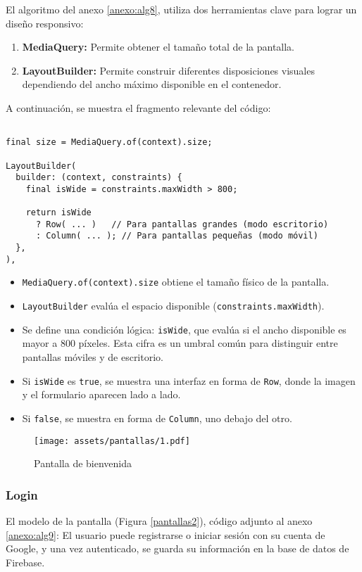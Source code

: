 El algoritmo del anexo \ref{anexo:alg8}, utiliza dos herramientas clave para lograr un diseño responsivo:

\begin{enumerate}
    \item \textbf{MediaQuery:} Permite obtener el tamaño total de la pantalla.
    \item \textbf{LayoutBuilder:} Permite construir diferentes disposiciones visuales dependiendo del ancho máximo disponible en el contenedor.
\end{enumerate}

A continuación, se muestra el fragmento relevante del código:

\begin{verbatim}

final size = MediaQuery.of(context).size;

LayoutBuilder(
  builder: (context, constraints) {
    final isWide = constraints.maxWidth > 800;

    return isWide
      ? Row( ... )   // Para pantallas grandes (modo escritorio)
      : Column( ... ); // Para pantallas pequeñas (modo móvil)
  },
),
\end{verbatim}



\begin{itemize}
    \item \texttt{MediaQuery.of(context).size} obtiene el tamaño físico de la pantalla.
    \item \texttt{LayoutBuilder} evalúa el espacio disponible (\texttt{constraints.maxWidth}).
    \item Se define una condición lógica: \texttt{isWide}, que evalúa si el ancho disponible es mayor a 800 píxeles. Esta cifra es un umbral común para distinguir entre pantallas móviles y de escritorio.
    \item Si \texttt{isWide} es \texttt{true}, se muestra una interfaz en forma de \texttt{Row}, donde la imagen y el formulario aparecen lado a lado.
    \item Si \texttt{false}, se muestra en forma de \texttt{Column}, uno debajo del otro.
\end{itemize}

\begin{figure}[h!]
\centering
  \texttt{[image: assets/pantallas/1.pdf]}
  \caption{Pantalla de bienvenida}
  \label{pantallas1}
\end{figure}

\newpage
\subsubsection*{Login}
El modelo de la pantalla (Figura \ref{pantallas2}), código adjunto al anexo \ref{anexo:alg9}: El usuario puede registrarse o iniciar sesión con su cuenta de Google, y una vez autenticado, se guarda su información en la base de datos de Firebase.


